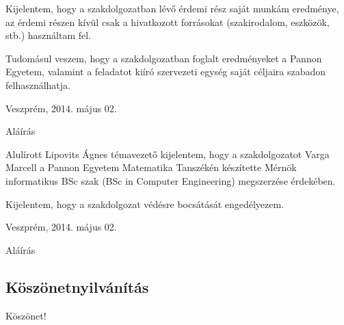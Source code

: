 \documentclass[a4paper,12pt,oneside]{report}
\begin{document}
Kijelentem, hogy a szakdolgozatban lévő érdemi rész saját munkám eredménye, az érdemi részen kívül csak a hivatkozott forrásokat (szakirodalom, eszközök, stb.) használtam fel.

Tudomásul veszem, hogy a szakdolgozatban foglalt eredményeket a Pannon Egyetem, valamint a feladatot kiíró szervezeti egység saját céljaira szabadon felhasználhatja.\\

\begin{flushleft}
{Veszprém, 2014. május 02.\\}
\end{flushleft}

\begin{flushright}
{Aláírás \vspace{4cm}}
\end{flushright}

Alulírott Lipovits Ágnes témavezető kijelentem, hogy a szakdolgozatot Varga Marcell a Pannon Egyetem Matematika Tanszékén készítette Mérnök informatikus BSc szak (BSc in Computer Engineering) megszerzése érdekében.

Kijelentem, hogy a szakdolgozat védésre bocsátását engedélyezem.\\

\begin{flushleft}
{Veszprém, 2014. május 02.\\}
\end{flushleft}

\begin{flushright}
{Aláírás}
\end{flushright}
\newpage
\pagebreak
\begin{center}
\section*{Köszönetnyilvánítás}
\end{center}

Köszönet!
\\
\\
\\
\\

\newpage
\end{document}
